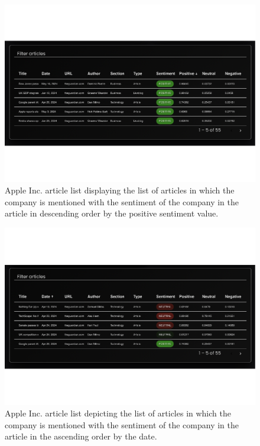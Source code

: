 \begin{figure}[htbp]
    \centering
    \includegraphics[width=\textwidth]{img/user/apple-articles-order-positive-a.pdf}
    \caption{Apple Inc. article list displaying the list of articles in which the company is mentioned with the sentiment of the company in the article in descending order by the positive sentiment value.}
    \label{fig:apple-articles-positive}
\end{figure}

\begin{figure}[htbp]
    \centering
    \includegraphics[width=\textwidth]{img/user/apple-articles-order-date-a.pdf}
    \caption{Apple Inc. article list depicting the list of articles in which the company is mentioned with the sentiment of the company in the article in the ascending order by the date.}
    \label{fig:apple-articles-date}
\end{figure}

